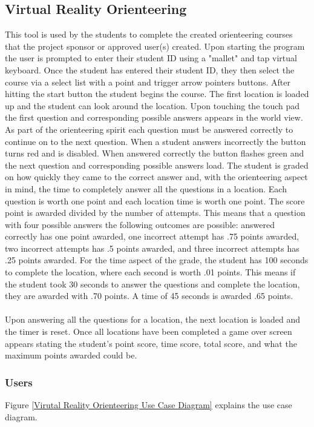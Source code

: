 \subsection{Virtual Reality Orienteering}
This tool is used by the students to complete the created orienteering courses that the project sponsor or approved user(s) created. Upon starting the program the user is prompted to enter their student ID using a "mallet" and tap virtual keyboard. Once the student has entered their student ID, they then select the course via a select list with a point and trigger arrow pointers buttons. After hitting the start button the student begins the course. The first location is loaded up and the student can look around the location. Upon touching the touch pad the first question and corresponding possible answers appears in the world view. As part of the orienteering spirit each question must be answered correctly to continue on to the next question. When a student answers incorrectly the button turns red and is disabled. When answered correctly the button flashes green and the next question and corresponding possible answers load. The student is graded on how quickly they came to the correct answer and, with the orienteering aspect in mind, the time to completely answer all the questions in a location. Each question is worth one point and each location time is worth one point. The score point is awarded divided by the number of attempts. This means that a question with four possible answers the following outcomes are possible: answered correctly has one point awarded, one incorrect attempt has .75 points awarded, two incorrect attempts has .5 points awarded, and three incorrect attempts has .25 points awarded. For the time aspect of the grade, the student has 100 seconds to complete the location, where each second is worth .01 points. This means if the student took 30 seconds to answer the questions and complete the location, they are awarded with .70 points. A time of 45 seconds is awarded .65 points. \\
\\
Upon answering all the questions for a location, the next location is loaded and the timer is reset. Once all locations have been completed a game over screen appears stating the student's point score, time score, total score, and what the maximum points awarded could be. 
\subsubsection{Users}
Figure \ref{Virutal Reality Orienteering Use Case Diagram} explains the use case diagram.

